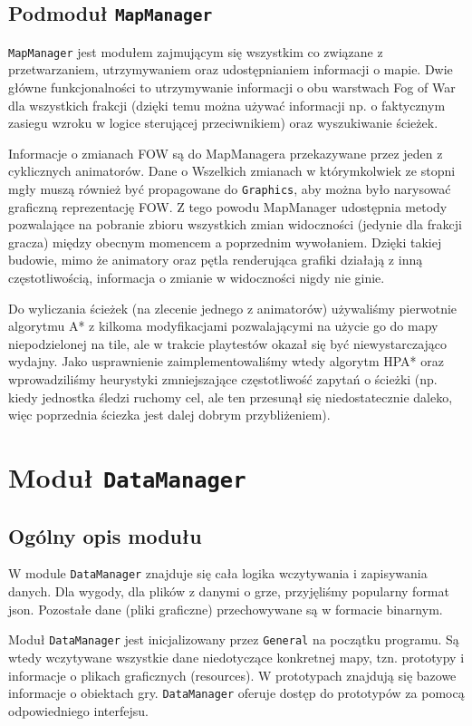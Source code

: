 \documentclass[licencjacka]{pracamgr}
\begin{document}
    \subsection{Podmoduł \texttt{MapManager}}
    \texttt{MapManager} jest modułem zajmującym się wszystkim co związane z przetwarzaniem, utrzymywaniem oraz udostępnianiem
    informacji o mapie. Dwie główne funkcjonalności to utrzymywanie informacji o obu warstwach Fog of War dla wszystkich
    frakcji (dzięki temu można używać informacji np. o faktycznym zasiegu wzroku w logice sterującej przeciwnikiem) oraz
    wyszukiwanie ścieżek.

    Informacje o zmianach FOW są do MapManagera przekazywane przez jeden z cyklicznych animatorów. Dane o Wszelkich
    zmianach w którymkolwiek ze stopni mgły muszą również być propagowane do \texttt{Graphics}, aby można było narysować
    graficzną reprezentację FOW. Z tego powodu MapManager udostępnia metody pozwalające na pobranie zbioru wszystkich
    zmian widoczności (jedynie dla frakcji gracza) między obecnym momencem a poprzednim wywołaniem. Dzięki takiej
    budowie, mimo że animatory oraz pętla renderująca grafiki działają z inną częstotliwością, informacja o zmianie w
    widoczności nigdy nie ginie.

    Do wyliczania ścieżek (na zlecenie jednego z animatorów) używaliśmy pierwotnie algorytmu A*\cite{A*} z kilkoma
    modyfikacjami pozwalającymi na użycie go do mapy niepodzielonej na tile, ale w trakcie playtestów okazał się być
    niewystarczająco wydajny. Jako usprawnienie zaimplementowaliśmy wtedy algorytm HPA*\cite{HPA} oraz wprowadziliśmy
    heurystyki zmniejszające częstotliwość zapytań o ścieżki (np. kiedy jednostka śledzi ruchomy cel, ale ten przesunął
    się niedostatecznie daleko, więc poprzednia ściezka jest dalej dobrym przybliżeniem).

  \section{Moduł \texttt{DataManager}}
    \subsection{Ogólny opis modułu}
      W module \texttt{DataManager} znajduje się cała logika wczytywania i zapisywania danych. Dla wygody, dla plików z
      danymi o grze, przyjęliśmy popularny format json. Pozostałe dane (pliki graficzne) przechowywane są w formacie
      binarnym.

      Moduł \texttt{DataManager} jest inicjalizowany przez \texttt{General} na początku programu. Są wtedy wczytywane wszystkie dane
      niedotyczące konkretnej mapy, tzn. prototypy i informacje o plikach graficznych (resources). W prototypach
      znajdują się bazowe informacje o obiektach gry. \texttt{DataManager} oferuje dostęp do prototypów za pomocą
      odpowiedniego interfejsu.
\end{document}
